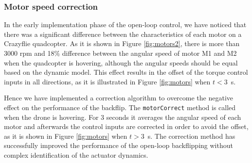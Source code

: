 \subsubsection{Motor speed correction}
In the early implementation phase of the open-loop control, we have noticed that there was a significant difference between the characteristics of each motor on a Crazyflie quadcopter. As it is shown in Figure \ref{fig:motors2}, there is more than 3000 rpm and 18\% difference between the angular speed of motor M1 and M2 when the quadcopter is hovering, although the angular speeds should be equal based on the dynamic model. This effect results in the offset of the torque control inputs in all directions, as it is illustrated in Figure \ref{fig:motors} when $t<3$~s.

Hence we have implemented a correction algorithm to overcome the negative effect on the performance of the backflip. The \verb+motorCorrect+ method is called when the drone is hovering. For 3 seconds it averages the angular speed of each motor and afterwards the control inputs are corrected in order to avoid the offset, as it is shown in Figure  \ref{fig:motors} when $t>3$~s. The correction method has successfully improved the performance of the open-loop backflipping without complex identification of the actuator dynamics.

